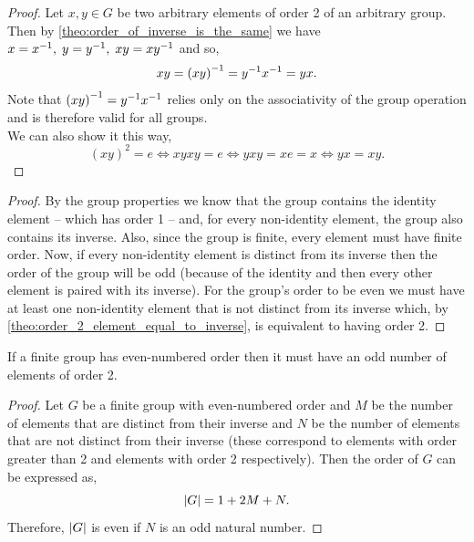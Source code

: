 \documentclass[MathsNotesBase.tex]{subfiles}
\begin{document}
{	
	\begin{proof}
		Let ${ x,y \in G }$ be two arbitrary elements of order 2 of an arbitrary group. Then by \autoref{theo:order_of_inverse_is_the_same} we have ${ x = {x}^{-1},\; y = {y}^{-1},\; xy = {xy}^{-1} }$ and so,
		\[ xy = {(xy)}^{-1} = {y}^{-1}{x}^{-1} = yx. \]
		Note that ${ {(xy)}^{-1} = {y}^{-1}{x}^{-1} }$ relies only on the associativity of the group operation and is therefore valid for all groups.\\
		We can also show it this way,
		\[ (xy)^2 = e \iff xyxy = e \iff yxy = xe = x \iff yx = xy. \]
	\end{proof}

	\begin{proof}
		By the group properties we know that the group contains the identity element -- which has order 1 -- and, for every non-identity element, the group also contains its inverse. Also, since the group is finite, every element must have finite order. Now, if every non-identity element is distinct from its inverse then the order of the group will be odd (because of the identity and then every other element is paired with its inverse). For the group's order to be even we must have at least one non-identity element that is not distinct from its inverse which, by \autoref{theo:order_2_element_equal_to_inverse}, is equivalent to having order 2.
	\end{proof}
	\begin{corollary}
		If a finite group has even-numbered order then it must have an odd number of elements of order 2.
	\end{corollary}
	\begin{proof}
		Let $G$ be a finite group with even-numbered order and $M$ be the number of elements that are distinct from their inverse and $N$ be the number of elements that are not distinct from their inverse (these correspond to elements with order greater than 2 and elements with order 2 respectively). Then the order of $G$ can be expressed as,
		\[ \left\lvert G\right\rvert = 1 + 2M + N. \]
		Therefore, ${ \left\lvert G\right\rvert }$ is even if $N$ is an odd natural number.
	\end{proof}

}
\end{document}
